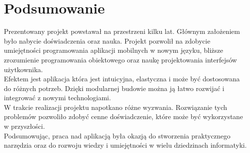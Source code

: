 \section{Podsumowanie}

Prezentowany projekt powstawał na przestrzeni kilku lat. Głównym założeniem było nabycie doświadczenia oraz nauka. Projekt pozwolił na zdobycie umiejętności programowania aplikacji mobilnych w nowym języku, bliższe zrozumienie programowania obiektowego oraz naukę projektowania interfejsów użytkownika.\\

Efektem jest aplikacja która jest intuicyjna, elastyczna i może być dostosowana do różnych potrzeb. Dzięki modularnej budowie można ją łatwo rozwijać i integrować z nowymi technologiami.\\

W trakcie realizacji projektu napotkano różne wyzwania. Rozwiązanie tych problemów pozwoliło zdobyć cenne doświadczenie, które może być wykorzystane w przyszłości.\\

Podsumowując, praca nad aplikacją była okazją do stworzenia praktycznego narzędzia oraz do rozwoju wiedzy i umiejętności w wielu dziedzinach informatyki.
